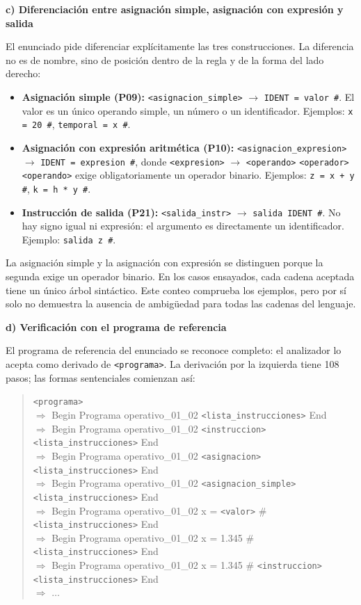 \documentclass[11pt,letterpaper]{article}
\newcommand{\apartado}[1]{\par\Needspace{4\baselineskip}\medskip\noindent\textbf{#1}\par\nobreak\smallskip}
\newcommand{\nt}[1]{\texttt{\textless #1\textgreater}}
\begin{document}
\apartado{c) Diferenciación entre asignación simple, asignación con expresión y salida}

El enunciado pide diferenciar explícitamente las tres construcciones. La diferencia no es de
nombre, sino de posición dentro de la regla y de la forma del lado derecho:

\begin{itemize}
  \item \textbf{Asignación simple (P09):} \nt{asignacion\_simple} $\rightarrow$ \texttt{IDENT = valor \#}.
  El valor es un único operando simple, un número o un identificador. Ejemplos:
  \texttt{x = 20 \#}, \texttt{temporal = x \#}.
  \item \textbf{Asignación con expresión aritmética (P10):}
  \nt{asignacion\_expresion} $\rightarrow$ \texttt{IDENT = expresion \#}, donde
  \nt{expresion} $\rightarrow$ \nt{operando} \nt{operador} \nt{operando} exige obligatoriamente un
  operador binario. Ejemplos: \texttt{z = x + y \#}, \texttt{k = h * y \#}.
  \item \textbf{Instrucción de salida (P21):} \nt{salida\_instr} $\rightarrow$ \texttt{salida IDENT \#}.
  No hay signo igual ni expresión: el argumento es directamente un identificador. Ejemplo:
  \texttt{salida z \#}.
\end{itemize}

La asignación simple y la asignación con expresión se distinguen porque la segunda exige un
operador binario. En los casos ensayados, cada cadena aceptada tiene un único árbol sintáctico.
Este conteo comprueba los ejemplos, pero por sí solo no demuestra la ausencia de ambigüedad
para todas las cadenas del lenguaje.

\apartado{d) Verificación con el programa de referencia}

El programa de referencia del enunciado se reconoce completo: el analizador lo acepta como
derivado de \nt{programa}. La derivación por la izquierda tiene 108 pasos; las formas sentenciales
comienzan así:

\begin{quote}\small\ttfamily
\nt{programa}\\
$\Rightarrow$ Begin Programa operativo\_01\_02 \nt{lista\_instrucciones} End\\
$\Rightarrow$ Begin Programa operativo\_01\_02 \nt{instruccion} \nt{lista\_instrucciones} End\\
$\Rightarrow$ Begin Programa operativo\_01\_02 \nt{asignacion} \nt{lista\_instrucciones} End\\
$\Rightarrow$ Begin Programa operativo\_01\_02 \nt{asignacion\_simple} \nt{lista\_instrucciones} End\\
$\Rightarrow$ Begin Programa operativo\_01\_02 x = \nt{valor} \# \nt{lista\_instrucciones} End\\
$\Rightarrow$ Begin Programa operativo\_01\_02 x = 1.345 \# \nt{lista\_instrucciones} End\\
$\Rightarrow$ Begin Programa operativo\_01\_02 x = 1.345 \# \nt{instruccion} \nt{lista\_instrucciones} End\\
$\Rightarrow$ $\ldots$
\end{quote}
\end{document}
